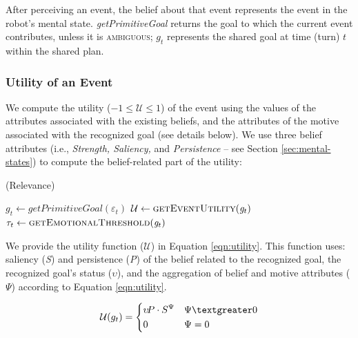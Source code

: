 \documentclass[12pt]{report}
\begin{document}
After perceiving an event, the belief about that event represents the event in
the robot's mental state. \textit{getPrimitiveGoal} returns the goal to which
the current event contributes, unless it is \textsc{ambiguous}; $g_{t}$
represents the shared goal at time (turn) $t$ within the shared plan. 

\vspace*{-4mm}
\subsubsection{Utility of an Event}
We compute the utility ($-1 \leq \mathcal{U} \leq 1$) of the event using the
values of the attributes associated with the existing beliefs, and the
attributes of the motive associated with the recognized goal (see details
below). We use three belief attributes (i.e., \textit{Strength, Saliency,} and 
\textit{Persistence} -- see Section \ref{sec:mental-states}) to compute the
belief-related part of the utility:

\begin{algorithm}
	\caption{(Relevance)}
	\label{alg:relevance}
	\begin{algorithmic}[1]
 			\Statex
			\State $\mathit{g}_{t} \gets \textit{getPrimitiveGoal}{(\varepsilon_t)}$
 			\Statex
			\State $\mathcal{U} \gets \Call{getEventUtility}{\mathit{g}_{t}}$
			\State $\tau_{t} \gets \Call{getEmotionalThreshold}{\mathit{g}_{t}}$
 			\Statex
 				\State {}
			\Else 
 				\State {}
			\EndIf
		\EndFunction
	\end{algorithmic}
\end{algorithm}

We provide the utility function ($\mathcal{U}$) in Equation \ref{eqn:utility}.
This function uses: saliency (\textit{S}) and persistence (\textit{P}) of the
belief related to the recognized goal, the recognized goal's status
($\upsilon$), and the aggregation of belief and motive attributes ($\Psi$)
according to Equation \ref{eqn:utility}.

\begin{equation}
    \mathcal{U}(g_t)= 
    \begin{dcases}
       \upsilon\!P\cdot S^{\Psi} & \Psi \textgreater 0 \\
       0               			 & \Psi = 0
    \end{dcases}
    \label{eqn:utility}
\end{equation}
\end{document}
